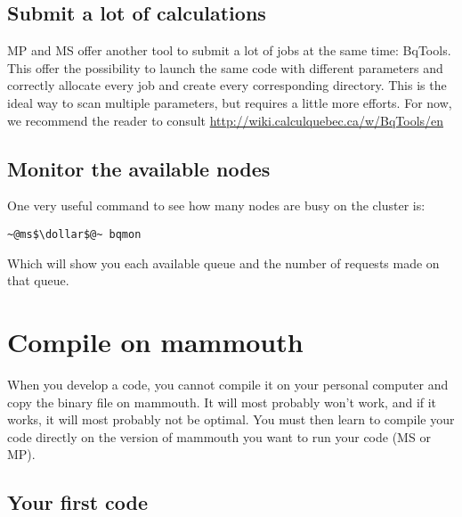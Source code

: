 \documentclass[10pt,letter]{article}
\newcommand{\dollar}{\mbox{\textdollar}}
\begin{document}
\subsection{Submit a lot of calculations}
\label{bqsubmit}

MP and MS offer another tool to submit a lot of jobs at the same time: BqTools.
This offer the possibility to launch the same code with different parameters and correctly allocate every job
and create every corresponding directory. 
This is the ideal way to scan multiple parameters, but requires a little more efforts. 
For now, we recommend the reader to consult \url{http://wiki.calculquebec.ca/w/BqTools/en}



\subsection{Monitor the available nodes}
One very useful command to see how many nodes are busy on the cluster is: 
\begin{bashInput}
\begin{lstlisting}[style=BashInputStyle]
~@ms$\dollar$@~ bqmon
\end{lstlisting}
\end{bashInput}
Which will show you each available queue and the number of requests made on that queue.

\section{Compile on mammouth}

When you develop a code, you cannot compile it on your personal computer and copy the binary file on mammouth.
It will most probably won't work, and if it works, it will most probably not be optimal.
You must then learn to compile your code directly on the version of mammouth you want to run your code (MS or MP).

\subsection{Your first code}
\end{document}
